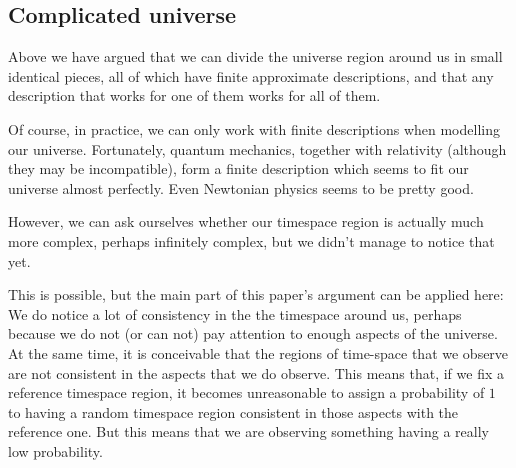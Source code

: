 \documentclass[a4paper
,draft
]{article}
\newcommand{\svn}[2][]{\todo[author=Virgil,color=red!25!white,#1]{#2}}
\def\reale{\mathbb{R}}
\newcommand{\ghilimele}[1]{``#1"}
\begin{document}




\subsection{Complicated universe}

Above we have argued that we can divide the universe region around us in small
identical pieces, all of which have finite approximate descriptions, and that
any description that works for one of them works for all of them.

Of course, in practice, we can only work with finite descriptions when
modelling our universe.
Fortunately, quantum mechanics, together with
relativity (although they may be incompatible), form a finite description which
seems to fit our universe almost perfectly.
Even Newtonian physics seems to be pretty good.

However, we can ask ourselves whether our timespace
region is actually much more complex, perhaps infinitely complex,
but we didn't manage to notice that yet.

This is possible, but the main part of this paper's argument can be applied here:
We do notice a lot of consistency in the the timespace around us, perhaps
because we do not (or can not) pay attention to enough aspects of the universe.
At the same time, it is conceivable that the regions of time-space that we
observe are not consistent in the aspects that we do observe.
This means that, if we fix a reference timespace region, it
becomes unreasonable to assign a probability of $1$ to having a random
timespace region consistent in those aspects with the reference one.
But this means that we are observing something having a really low probability.
\end{document}
